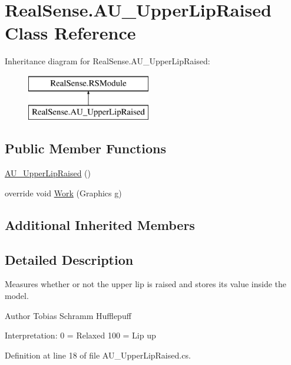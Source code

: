 \hypertarget{class_real_sense_1_1_a_u___upper_lip_raised}{}\section{Real\+Sense.\+A\+U\+\_\+\+Upper\+Lip\+Raised Class Reference}
\label{class_real_sense_1_1_a_u___upper_lip_raised}
Inheritance diagram for Real\+Sense.\+A\+U\+\_\+\+Upper\+Lip\+Raised\+:\begin{figure}[H]
\begin{center}
\leavevmode
\includegraphics[height=2.000000cm]{class_real_sense_1_1_a_u___upper_lip_raised}
\end{center}
\end{figure}
\subsection*{Public Member Functions}
\begin{DoxyCompactItemize}
\item 
\hyperlink{class_real_sense_1_1_a_u___upper_lip_raised_a5434d7543bd2427609ca554f85173d5a}{A\+U\+\_\+\+Upper\+Lip\+Raised} ()
\item 
override void \hyperlink{class_real_sense_1_1_a_u___upper_lip_raised_a22ea7b3343701718bb2aea731850d81a}{Work} (Graphics g)
\end{DoxyCompactItemize}
\subsection*{Additional Inherited Members}


\subsection{Detailed Description}
Measures whether or not the upper lip is raised and stores its\textquotesingle{} value inside the model. \begin{DoxyAuthor}{Author}
Tobias Schramm  Hufflepuff
\end{DoxyAuthor}
Interpretation\+: 0 = Relaxed 100 = Lip up 

Definition at line 18 of file A\+U\+\_\+\+Upper\+Lip\+Raised.\+cs.



